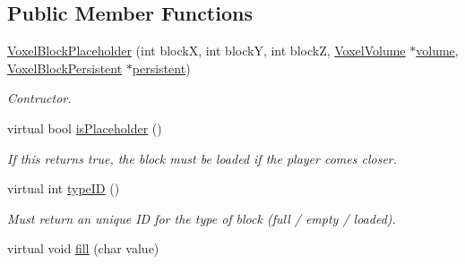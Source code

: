 \subsection*{\-Public \-Member \-Functions}
\begin{DoxyCompactItemize}
\item 
\hypertarget{classVoxelBlockPlaceholder_a440e94d2fa44c8d1dbfd8f997fe6e48d}{
\hyperlink{classVoxelBlockPlaceholder_a440e94d2fa44c8d1dbfd8f997fe6e48d}{\-Voxel\-Block\-Placeholder} (int block\-X, int block\-Y, int block\-Z, \hyperlink{classVoxelVolume}{\-Voxel\-Volume} $\ast$\hyperlink{classVoxelBlock_aa8398251c9d5d3ba466e8993bcb6eb38}{volume}, \hyperlink{classVoxelBlockPersistent}{\-Voxel\-Block\-Persistent} $\ast$\hyperlink{classVoxelBlock_ad9d2e2c26398379b6a92e2e5ea4ab20d}{persistent})}
\label{d0/def/classVoxelBlockPlaceholder_a440e94d2fa44c8d1dbfd8f997fe6e48d}

\begin{DoxyCompactList}\small\item\em \-Contructor. \end{DoxyCompactList}\item 
\hypertarget{classVoxelBlockPlaceholder_ad3ef6a4b4dfa83895a3e9e95bb164edf}{
virtual bool \hyperlink{classVoxelBlockPlaceholder_ad3ef6a4b4dfa83895a3e9e95bb164edf}{is\-Placeholder} ()}
\label{d0/def/classVoxelBlockPlaceholder_ad3ef6a4b4dfa83895a3e9e95bb164edf}

\begin{DoxyCompactList}\small\item\em \-If this returns true, the block must be loaded if the player comes closer. \end{DoxyCompactList}\item 
\hypertarget{classVoxelBlockPlaceholder_a9d3446d2e53449a9d553ba55b6e2e666}{
virtual int \hyperlink{classVoxelBlockPlaceholder_a9d3446d2e53449a9d553ba55b6e2e666}{type\-I\-D} ()}
\label{d0/def/classVoxelBlockPlaceholder_a9d3446d2e53449a9d553ba55b6e2e666}

\begin{DoxyCompactList}\small\item\em \-Must return an unique \-I\-D for the type of block (full / empty / loaded). \end{DoxyCompactList}\item 
\hypertarget{classVoxelBlockPlaceholder_ac880ec621166c7dd1b735e4398d26fe2}{
virtual void \hyperlink{classVoxelBlockPlaceholder_ac880ec621166c7dd1b735e4398d26fe2}{fill} (char value)}
\label{d0/def/classVoxelBlockPlaceholder_ac880ec621166c7dd1b735e4398d26fe2}


\end{DoxyCompactItemize}
